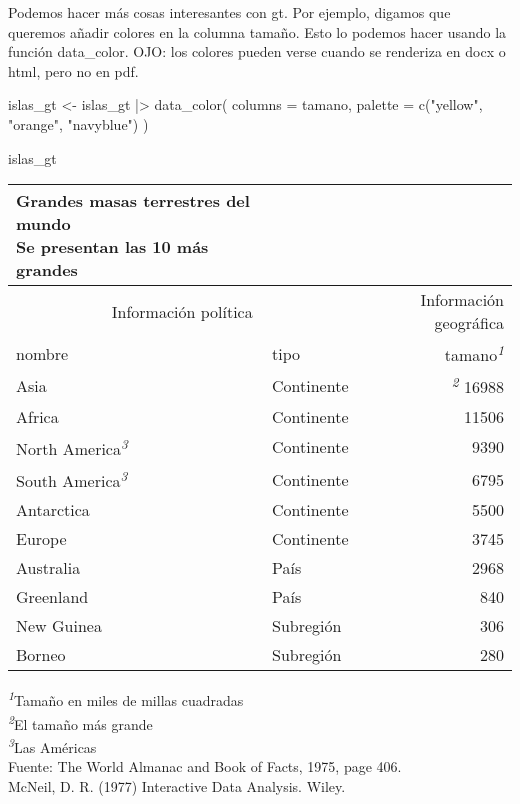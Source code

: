 \documentclass[
]{article}
\newenvironment{Shaded}{\begin{snugshade}}{\end{snugshade}}
\newcommand{\AttributeTok}[1]{\textcolor[rgb]{0.77,0.63,0.00}{#1}}
\newcommand{\FunctionTok}[1]{\textcolor[rgb]{0.00,0.00,0.00}{#1}}
\newcommand{\NormalTok}[1]{#1}
\newcommand{\OtherTok}[1]{\textcolor[rgb]{0.56,0.35,0.01}{#1}}
\newcommand{\SpecialCharTok}[1]{\textcolor[rgb]{0.00,0.00,0.00}{#1}}
\newcommand{\StringTok}[1]{\textcolor[rgb]{0.31,0.60,0.02}{#1}}
\begin{document}
Podemos hacer más cosas interesantes con gt. Por ejemplo, digamos que
queremos añadir colores en la columna tamaño. Esto lo podemos hacer
usando la función data\_color. OJO: los colores pueden verse cuando se
renderiza en docx o html, pero no en pdf.

\begin{Shaded}
\begin{Highlighting}[]
\NormalTok{islas\_gt }\OtherTok{\textless{}{-}}\NormalTok{ islas\_gt }\SpecialCharTok{|\textgreater{}} 
  \FunctionTok{data\_color}\NormalTok{(}
    \AttributeTok{columns =}\NormalTok{ tamano,}
    \AttributeTok{palette =} \FunctionTok{c}\NormalTok{(}\StringTok{"yellow"}\NormalTok{, }\StringTok{"orange"}\NormalTok{, }\StringTok{"navyblue"}\NormalTok{)}
\NormalTok{  )}

\NormalTok{islas\_gt}
\end{Highlighting}
\end{Shaded}

\setlength{\LTpost}{0mm}
\begin{longtable}{llr}
\caption*{
{\large Grandes masas terrestres del mundo} \\ 
{\small Se presentan las 10 más grandes}
} \\ 
\toprule
\multicolumn{2}{c}{Información política} & Información geográfica \\ 
\cmidrule(lr){1-2} \cmidrule(lr){3-3}
nombre & tipo & tamano\textsuperscript{\textit{1}} \\ 
\midrule
Asia & Continente & \textsuperscript{\textit{2}} 16988 \\ 
Africa & Continente & 11506 \\ 
North America\textsuperscript{\textit{3}} & Continente & 9390 \\ 
South America\textsuperscript{\textit{3}} & Continente & 6795 \\ 
Antarctica & Continente & 5500 \\ 
Europe & Continente & 3745 \\ 
Australia & País & 2968 \\ 
Greenland & País & 840 \\ 
New Guinea & Subregión & 306 \\ 
Borneo & Subregión & 280 \\ 
\bottomrule
\end{longtable}
\begin{minipage}{\linewidth}
\textsuperscript{\textit{1}}Tamaño en miles de millas cuadradas\\
\textsuperscript{\textit{2}}El tamaño más grande\\
\textsuperscript{\textit{3}}Las Américas\\
Fuente: The World Almanac and Book of Facts, 1975, page 406.\\
McNeil, D. R. (1977) Interactive Data Analysis. Wiley.\\
\end{minipage}
\end{document}
